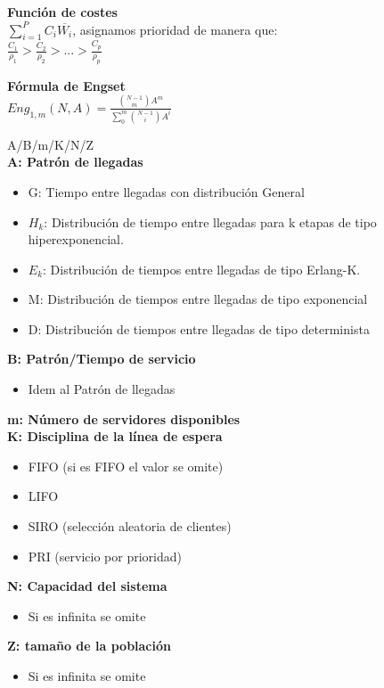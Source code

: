 \vfill\null
\columnbreak
\begin{minipage}{.22\textwidth}
	{\bf Función de costes} \\
	$\sum_{i=1}^P{C_i}{\overline{W_i}}$, asignamos prioridad de manera que: \\
	$\frac{C_1}{\rho_1} > \frac{C_2}{\rho_2} > ... > \frac{C_p}{\rho_p}$ \\
\end{minipage}
\begin{minipage}{.22\textwidth}
	{\bf Fórmula de Engset} \\
	$Eng_{1,m}(N,A)=\frac{\binom{N-1}{m}A^m}{\sum_0^m{\binom{N-1}{i}A^i}}$ \\
\end{minipage}

\begin{minipage}{.22\textwidth}
	A/B/m/K/N/Z \\
	{\bf A: Patrón de llegadas}
	\begin{itemize}[leftmargin=1em]
		\item G: Tiempo entre llegadas con distribución General
		\item $H_k$: Distribución de tiempo entre llegadas para k etapas de tipo hiperexponencial.
		\item $E_k$: Distribución de tiempos entre llegadas de tipo Erlang-K.
		\item M: Distribución de tiempos entre llegadas de tipo exponencial
		\item D: Distribución de tiempos entre llegadas de tipo determinista
	\end{itemize}
	{\bf B: Patrón/Tiempo de servicio}
	\begin{itemize}[leftmargin=1em]
		\item Idem al Patrón de llegadas
	\end{itemize}
	{\bf m: Número de servidores disponibles} \\
	{\bf K: Disciplina de la línea de espera}
	\begin{itemize}[leftmargin=1em]
		\item FIFO (si es FIFO el valor se omite)
		\item LIFO
		\item SIRO (selección aleatoria de clientes)
		\item PRI (servicio por prioridad)
	\end{itemize}
	{\bf N: Capacidad del sistema }
	\begin{itemize}[leftmargin=1em]
		\item Si es infinita se omite
	\end{itemize}
	{\bf Z: tamaño de la población}
	\begin{itemize}[leftmargin=1em]
		\item Si es infinita se omite
	\end{itemize}
\end{minipage}
